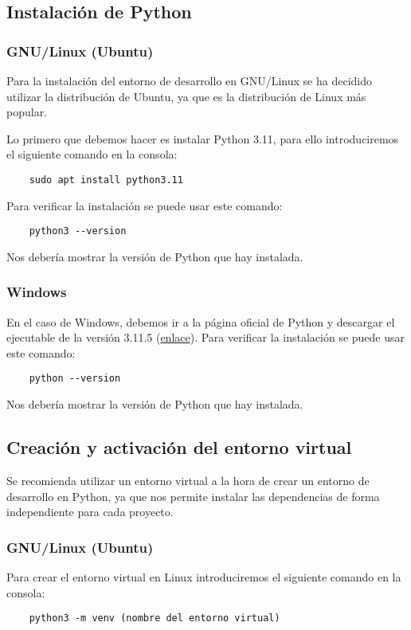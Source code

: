 \subsection{Instalación de Python}

\subsubsection{GNU/Linux (Ubuntu)}
Para la instalación del entorno de desarrollo en GNU/Linux se ha decidido utilizar la distribución de Ubuntu, ya que es la distribución de Linux más popular.~\cite{ubuntu}

Lo primero que debemos hacer es instalar Python 3.11, para ello introduciremos  el siguiente comando en la consola:
\begin{verbatim}
    sudo apt install python3.11
\end{verbatim}
Para verificar la instalación se puede usar este comando:
\begin{verbatim}
    python3 --version
\end{verbatim}
Nos debería mostrar la versión de Python que hay instalada.

\subsubsection{Windows}
En el caso de Windows, debemos ir a la página oficial de Python y descargar el ejecutable de la versión 3.11.5 (\href{https://www.python.org/downloads/release/python-3115/}{enlace}).
Para verificar la instalación se puede usar este comando:
\begin{verbatim}
    python --version
\end{verbatim}
Nos debería mostrar la versión de Python que hay instalada.

\subsection{Creación y activación del entorno virtual}
Se recomienda utilizar un entorno virtual a la hora de crear un entorno de desarrollo en Python, ya que nos permite instalar las dependencias de forma independiente para cada proyecto.

\subsubsection{GNU/Linux (Ubuntu)}
Para crear el entorno virtual en Linux introduciremos el siguiente comando en la consola:
\begin{verbatim}
    python3 -m venv (nombre del entorno virtual)
\end{verbatim}

